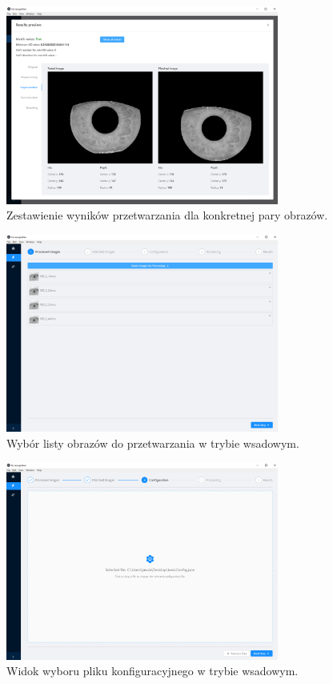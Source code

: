 \begin{figure}[ht]
  \centering
  \includegraphics[width=0.8\textwidth]{images/app/resultsPreviewSegmentation.png}
  \caption{Zestawienie wyników przetwarzania dla konkretnej pary obrazów.}
  \label{fig:stepResultPreview}
\end{figure}

\begin{figure}[ht]
  \centering
  \includegraphics[width=0.8\textwidth]{images/app/batchProcessing.png}
  \caption{Wybór listy obrazów do przetwarzania w trybie wsadowym.}
  \label{fig:batchFiles}
\end{figure}

\begin{figure}[ht]
  \centering
  \includegraphics[width=0.8\textwidth]{images/app/batchConfigSelected.png}
  \caption{Widok wyboru pliku konfiguracyjnego w trybie wsadowym.}
  \label{fig:batchConfig}
\end{figure}

